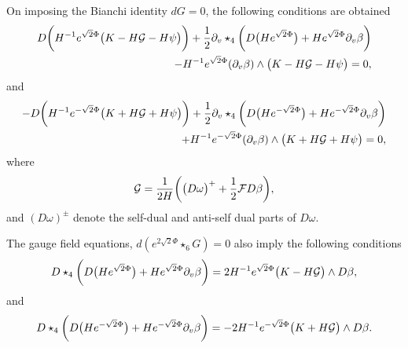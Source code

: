 On imposing the Bianchi identity $dG = 0$, the following conditions are obtained
\begin{eqnarray}
\label{bian61}
D \bigg(H^{-1} e^{\sqrt{2} \Phi} \big(K-H {\cal{G}}-H \psi \big) \bigg)
+{1 \over 2}\partial_v \star_4 \bigg(D \big(H e^{\sqrt{2} \Phi}\big)+H e^{\sqrt{2}\Phi} \partial_v \beta \bigg)
\nonumber \\
-H^{-1} e^{\sqrt{2} \Phi} (\partial_v \beta) \wedge \big(K-H {\cal{G}}-H \psi \big)=0,
\end{eqnarray}
and
\begin{eqnarray}
\label{bian62}
-D \bigg(H^{-1} e^{-\sqrt{2} \Phi} \big(K+H {\cal{G}}+H \psi \big) \bigg)
+{1 \over 2}\partial_v \star_4 \bigg(D \big(H e^{-\sqrt{2} \Phi}\big)+H e^{-\sqrt{2}\Phi} \partial_v \beta \bigg)
\nonumber \\
+H^{-1} e^{-\sqrt{2} \Phi} (\partial_v \beta) \wedge \big(K+H {\cal{G}}+H \psi \big)=0,
\nonumber \\
\end{eqnarray}
where
\begin{eqnarray}
{\cal{G}}= {1 \over 2H} \bigg( \big(D \omega\big)^+ +{1 \over 2}{\cal{F}} D \beta \bigg),
\end{eqnarray}
and $(D \omega)^\pm$ denote the self-dual and anti-self dual parts of $D \omega$.

The gauge field equations, $d (e^{2 \sqrt{2} \Phi} \star_6 G)=0$ also imply the following conditions
\begin{eqnarray}
\label{gauge61}
D \star_4 \bigg(D \big(H e^{\sqrt{2} \Phi} \big) + H e^{\sqrt{2} \Phi} \partial_v \beta \bigg)
= 2 H^{-1} e^{\sqrt{2} \Phi} \big(K-H {\cal{G}} \big) \wedge D \beta,
\end{eqnarray}
and
\begin{eqnarray}
\label{gauge62}
D \star_4 \bigg(D \big(H e^{-\sqrt{2} \Phi} \big) + H e^{-\sqrt{2} \Phi} \partial_v \beta \bigg)
= -2 H^{-1} e^{-\sqrt{2} \Phi} \big(K+H {\cal{G}} \big) \wedge D \beta.
\end{eqnarray}

